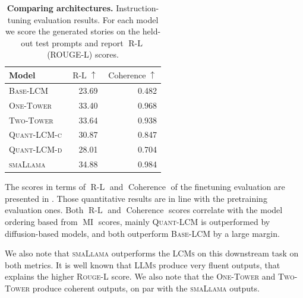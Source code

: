 \documentclass[twoside,11pt]{fairmeta}
\newcommand{\llms}{\textsc{LLMs}\xspace}
\newcommand{\sllama}{\textsc{smaLlama}\xspace}
\newcommand{\lcms}{\textsc{LCMs}\xspace}
\newcommand{\twotower}{\textsc{Two-Tower}\xspace}
\newcommand{\interleaved}{\textsc{One-Tower}\xspace}
\newcommand{\mselcm}{\textsc{Base-LCM}\xspace}
\newcommand{\qlcm}{\textsc{Quant-LCM}\xspace}
\newcommand{\qlcmd}{\textsc{Quant-LCM-d}\xspace}
\newcommand{\qlcmc}{\textsc{Quant-LCM-c}\xspace}
\DeclareMathOperator{\mutinfo}{MI}
\DeclareMathOperator{\rougel}{R-L}
\DeclareMathOperator{\coherence}{Coherence}
\newcommand{\rougellong}{\textsc{Rouge-L}\xspace}
\begin{document}
\begin{table}[!htb]
    \centering
    \begin{tabular}{lrr}
        \toprule
        Model & $\rougel\uparrow$ & $\coherence\uparrow$ \\
        \midrule
        \mselcm &  23.69 & 0.482 \\
        
        \interleaved & 33.40 & 0.968  \\
        
        \twotower &  33.64 & 0.938 \\

        \qlcmc & 30.87 & 0.847  \\
        \qlcmd & 28.01 & 0.704  \\
        \midrule
        \sllama & 34.88 & 0.984\\
        \bottomrule
    \end{tabular}
    \caption{\textbf{Comparing architectures.} Instruction-tuning evaluation results. For each model we score the generated stories on the held-out test prompts and report $\rougel$ (ROUGE-L) scores.}
    \label{tab:ablation_results_finetuning}
\end{table}






The scores in terms of $\rougel$ and $\coherence$ of the finetuning evaluation are presented in .
Those quantitative results are in line with the pretraining evaluation ones. 
Both $\rougel$ and $\coherence$ scores correlate with the model ordering based from $\mutinfo$ scores, mainly \qlcm is outperformed by diffusion-based models, and both outperform \mselcm by a large margin. 

We also note that \sllama outperforms the \lcms on this downstream task on both metrics.
It is well known that \llms produce very fluent outputs, that explains the higher \rougellong score.
We also note that the \interleaved and \twotower produce coherent outputs, on par with the \sllama outputs.
\end{document}
